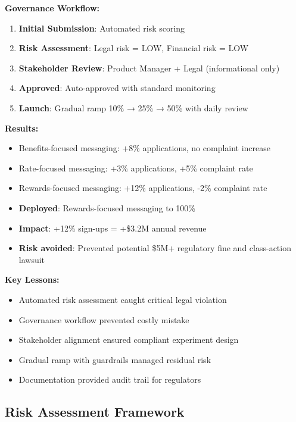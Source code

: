 \textbf{Governance Workflow:}
\begin{enumerate}
    \item \textbf{Initial Submission}: Automated risk scoring
    \item \textbf{Risk Assessment}: Legal risk = LOW, Financial risk = LOW
    \item \textbf{Stakeholder Review}: Product Manager + Legal (informational only)
    \item \textbf{Approved}: Auto-approved with standard monitoring
    \item \textbf{Launch}: Gradual ramp 10\% → 25\% → 50\% with daily review
\end{enumerate}

\textbf{Results:}
\begin{itemize}
    \item Benefits-focused messaging: +8\% applications, no complaint increase
    \item Rate-focused messaging: +3\% applications, +5\% complaint rate
    \item Rewards-focused messaging: +12\% applications, -2\% complaint rate
    \item \textbf{Deployed}: Rewards-focused messaging to 100\%
    \item \textbf{Impact}: +12\% sign-ups = +\$3.2M annual revenue
    \item \textbf{Risk avoided}: Prevented potential \$5M+ regulatory fine and class-action lawsuit
\end{itemize}

\textbf{Key Lessons:}
\begin{itemize}
    \item Automated risk assessment caught critical legal violation
    \item Governance workflow prevented costly mistake
    \item Stakeholder alignment ensured compliant experiment design
    \item Gradual ramp with guardrails managed residual risk
    \item Documentation provided audit trail for regulators
\end{itemize}

\subsection{Risk Assessment Framework}

